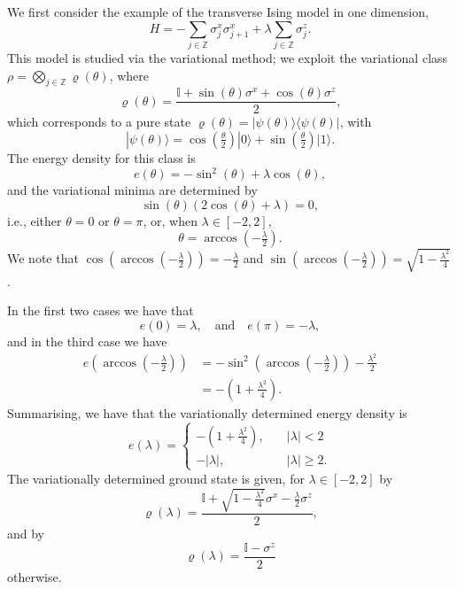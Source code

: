 \documentclass[prl,twocolumn,lengthcheck,superscriptaddress]{revtex4-1}
\theoremstyle{definition}
\theoremstyle{remark}
\begin{document}
We first consider the example of the transverse Ising model in one dimension,
\begin{equation}
	H = -\sum_{j\in\mathbb{Z}} \sigma^x_j\sigma_{j+1}^x + \lambda\sum_{j\in\mathbb{Z}} \sigma_j^z.
\end{equation}
This model is studied via the variational method; we exploit the variational class $\rho  = \bigotimes_{j\in\mathbb{Z}} \varrho(\theta)$, where
\begin{equation}
	\varrho(\theta) = \frac{\mathbb{I} + \sin(\theta)\sigma^x + \cos(\theta)\sigma^z}{2},
\end{equation}
which corresponds to a pure state $\varrho(\theta) = |\psi(\theta)\rangle\langle\psi(\theta)|$, with
\begin{equation}
	|\psi(\theta)\rangle = \cos(\tfrac{\theta}{2})|0\rangle+\sin(\tfrac{\theta}{2})|1\rangle.
\end{equation}
The energy density for this class is 
\begin{equation}
	e(\theta) = -\sin^2(\theta) + \lambda\cos(\theta),
\end{equation}
and the variational minima are determined by
\begin{equation}
	\sin(\theta)(2\cos(\theta) + \lambda) = 0,
\end{equation}
i.e., either $\theta = 0$ or $\theta  = \pi$, or, when $\lambda \in [-2,2]$, 
\begin{equation}
	\theta = \arccos(-\tfrac{\lambda}{2}).
\end{equation}
We note that $\cos(\arccos(-\tfrac{\lambda}{2})) = -\tfrac{\lambda}{2}$ and $\sin(\arccos(-\tfrac{\lambda}{2})) = \sqrt{1-\tfrac{\lambda^2}{4}}$.

In the first two cases we have that 
\begin{equation}
	e(0) = \lambda, \quad \text{and} \quad e(\pi) = -\lambda,
\end{equation}
and in the third case we have
\begin{equation}
	\begin{split}
	e(\arccos(-\tfrac{\lambda}{2})) &= -\sin^2(\arccos(-\tfrac{\lambda}{2})) - \frac{\lambda^2}{2} \\
	&= -\left(1+\frac{\lambda^2}{4}\right).
	\end{split}
\end{equation}
Summarising, we have that the variationally determined energy density is
\begin{equation}
	e(\lambda) = \begin{cases} -\left(1+\frac{\lambda^2}{4}\right), &\quad |\lambda|<2 \\
	-|\lambda|, &\quad |\lambda| \ge 2. \end{cases}
\end{equation}
The variationally determined ground state is given, for $\lambda \in [-2, 2]$ by
\begin{equation}
	\varrho(\lambda) = \frac{\mathbb{I} + \sqrt{1-\tfrac{\lambda^2}{4}}\sigma^x - \tfrac{\lambda}{2}\sigma^z}{2},
\end{equation}
and by
\begin{equation}
	\varrho(\lambda) = \frac{\mathbb{I} - \sigma^z}{2}
\end{equation}
otherwise.
\end{document}
